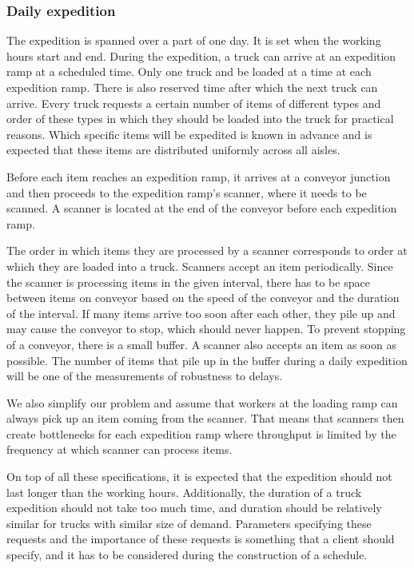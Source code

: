 \documentclass{ctuthesis}
\begin{document}
\subsubsection{Daily expedition}
The expedition is spanned over a part of one day. It is set when the working hours start and end. During the expedition, a truck can arrive at an expedition ramp at a scheduled time. Only one truck and be loaded at a time at each expedition ramp. There is also reserved time after which the next truck can arrive. Every truck requests a certain number of items of different types and order of these types in which they should be loaded into the truck for practical reasons. Which specific items will be expedited is known in advance and is expected that these items are distributed uniformly across all aisles. 

Before each item reaches an expedition ramp, it arrives at a conveyor junction and then proceeds to the expedition ramp's scanner, where it needs to be scanned. A scanner is located at the end of the conveyor before each expedition ramp. 

The order in which items they are processed by a scanner corresponds to order at which they are loaded into a truck. Scanners accept an item periodically. Since the scanner is processing items in the given interval, there has to be space between items on conveyor based on the speed of the conveyor and the duration of the interval. If many items arrive too soon after each other, they pile up and may cause the conveyor to stop, which should never happen. To prevent stopping of a conveyor, there is a small buffer.  A scanner also accepts an item as soon as possible. The number of items that pile up in the buffer during a daily expedition will be one of the measurements of robustness to delays.

We also simplify our problem and assume that workers at the loading ramp can always pick up an item coming from the scanner. That means that scanners then create bottlenecks for each expedition ramp where throughput is limited by the frequency at which scanner can process items.

On top of all these specifications, it is expected that the expedition should not last longer than the working hours. Additionally, the duration of a truck expedition should not take too much time, and duration should be relatively similar for trucks with similar size of demand. Parameters specifying these requests and the importance of these requests is something that a client should specify, and it has to be considered during the construction of a schedule.
\end{document}
